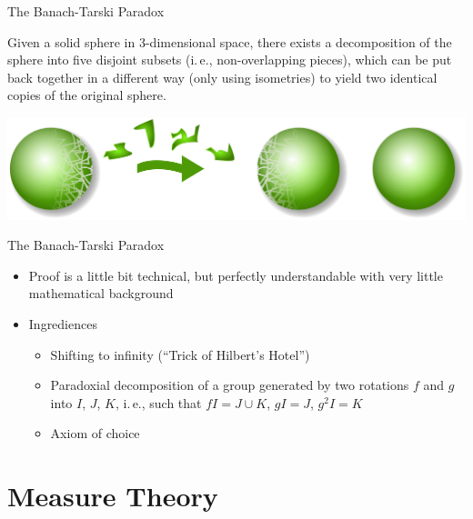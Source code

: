 \documentclass{beamer}
\begin{document}
\begin{frame}{The Banach-Tarski Paradox}
  \begin{theorem}
    Given a solid sphere in 3-dimensional space, there exists a decomposition of
    the sphere into five disjoint subsets (i.\,e., non-overlapping pieces),
    which can be put back together in a different way (only using isometries) to
    yield two identical copies of the original sphere.
  \end{theorem}
  \pause
  \includegraphics[width=\linewidth]{Banach-Tarski_Paradox-Illustration.png}
\end{frame}

\begin{frame}{The Banach-Tarski Paradox}
  \begin{itemize}
  \item Proof is a little bit technical, but perfectly understandable
     with very little mathematical background
  \item Ingrediences
    \begin{itemize}
    \item Shifting to infinity (``Trick of Hilbert's Hotel'')
    \item Paradoxial decomposition of a group generated by two rotations $f$ and $g$ into $I$, $J$, $K$, i.\,e., such that $fI = J \cup K$, $gI = J$, $g^2I = K$
    \item Axiom of choice
    \end{itemize}
  \end{itemize}
\end{frame}

\section{Measure Theory}
\end{document}

